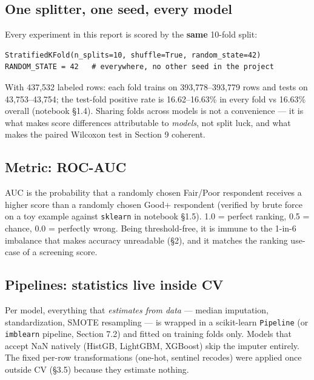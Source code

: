 \documentclass[11pt,a4paper]{article}
\begin{document}
{\subsection{One splitter, one seed, every model}\label{one-splitter-one-seed-every-model}

Every experiment in this report is scored by the \textbf{same} 10-fold split:

\begin{verbatim}
StratifiedKFold(n_splits=10, shuffle=True, random_state=42)
RANDOM_STATE = 42   # everywhere, no other seed in the project
\end{verbatim}

With 437,532 labeled rows: each fold trains on 393,778--393,779 rows and tests on 43,753--43,754; the test-fold positive rate is 16.62--16.63\% in every fold vs 16.63\% overall (notebook \S{}1.4). Sharing folds across models is not a convenience --- it is what makes score differences attributable to \emph{models}, not split luck, and what makes the paired Wilcoxon test in Section 9 coherent.

\subsection{Metric: ROC-AUC}\label{metric-roc-auc}

AUC is the probability that a randomly chosen Fair/Poor respondent receives a higher score than a randomly chosen Good+ respondent (verified by brute force on a toy example against \texttt{sklearn} in notebook \S{}1.5). 1.0 = perfect ranking, 0.5 = chance, 0.0 = perfectly wrong. Being threshold-free, it is immune to the 1-in-6 imbalance that makes accuracy unreadable (\S{}2), and it matches the ranking use-case of a screening score.

\subsection{Pipelines: statistics live inside CV}\label{pipelines-statistics-live-inside-cv}

Per model, everything that \emph{estimates from data} --- median imputation, standardization, SMOTE resampling --- is wrapped in a scikit-learn \texttt{Pipeline} (or \texttt{imblearn} pipeline, Section 7.2) and fitted on training folds only. Models that accept NaN natively (HistGB, LightGBM, XGBoost) skip the imputer entirely. The fixed per-row transformations (one-hot, sentinel recodes) were applied once outside CV (\S{}3.5) because they estimate nothing.

}
\end{document}
